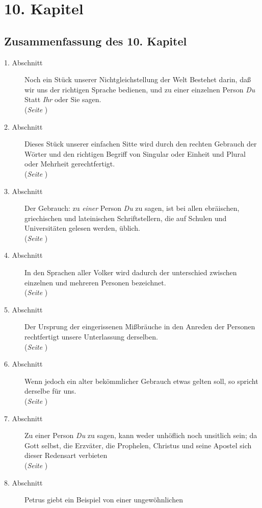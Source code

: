 
\chapter{10. Kapitel} \label{kap10}
\section{Zusammenfassung des 10. Kapitel}


\begin{description}
\item[1. Abschnitt] Noch ein Stück unserer Nichtgleichstellung der Welt Bestehet
darin, daß wir uns der richtigen Sprache bedienen, und zu einer einzelnen Person
\textit{Du} Statt \textit{Ihr} oder Sie sagen.
\\(\textit{Seite \pageref{kap10_ab1}})
\item[2. Abschnitt] Dieses Stück unserer einfachen Sitte wird durch den rechten
Gebrauch der Wörter und den richtigen Begriff von Singular oder Einheit und
Plural oder Mehrheit gerechtfertigt.
\\(\textit{Seite \pageref{kap10_ab2}})
\item[3. Abschnitt] Der Gebrauch: zu \textit{einer} Person \textit{Du} zu sagen, ist bei
allen ebräischen, griechischen und lateinischen Schriftstellern, die auf
Schulen und Universitäten gelesen werden, üblich.
\\(\textit{Seite \pageref{kap10_ab3}})
\item[4. Abschnitt] In den Sprachen aller Volker wird dadurch der unterschied
zwischen einzelnen und mehreren Personen bezeichnet.
\\(\textit{Seite \pageref{kap10_ab4}})
\item[5. Abschnitt] Der Ursprung der eingerissenen Mißbräuche in den Anreden der
Personen rechtfertigt unsere Unterlassung derselben.
\\(\textit{Seite \pageref{kap10_ab5}})
\item[6. Abschnitt] Wenn jedoch ein alter bekömmlicher Gebrauch etwas gelten
soll, so spricht derselbe für uns.
\\(\textit{Seite \pageref{kap10_ab6}})
\item[7. Abschnitt] Zu einer Person \textit{Du} zu sagen, kann weder unhöflich noch
unsitlich sein; da Gott selbst, die Erzväter, die Prophelen, Christus und
seine Apostel sich dieser Redensart verbieten
\\(\textit{Seite \pageref{kap10_ab7}})
\item[8. Abschnitt] Petrus giebt ein Beispiel von einer ungewöhnlichen

\end{description}

